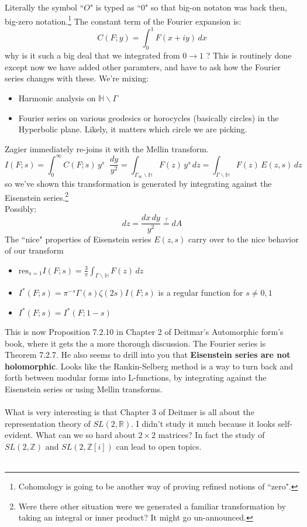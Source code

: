 \documentclass[12pt]{article}
\begin{document}
Literally the symbol ``$O$" is typed as ``$0$" so that big-on notaton was back then, big-zero notation.\footnote{Cohomology is going to be another way of proving refined notions of ``zero".}  The constant term of the Fourier expansion is:
$$ C(F;y) = \int_0^1 F(x + iy) \, dx $$
why is it such a big deal that we integrated from $0 \to 1$ ? This is routinely done except now we have added other paramters, and have to ask how the Fourier series changes with these.    We're mixing:
\begin{itemize}
\item Harmonic analysis on $\mathbb{H}\backslash \Gamma$
\item Fourier series on various geodesics or horocycles (basically circles) in the Hyperbolic plane.  Likely, it matters which circle we are picking.
\end{itemize}
Zagier immediately re-joins it with the Mellin transform. 
$$ I(F;s) = \int_0^\infty C(F;s) \, y^s \;\; \frac{dy}{y^2} 
= \int_{\Gamma_\infty \backslash \mathbb{H}} F(z) \, y^s \, dz = \int_{\Gamma \backslash \mathbb{H}} F(z) \, E(z,s) \, dz $$
so we've shown this transformation is {\color{red!50!black}generated} by integrating against the Eisenstein series.\footnote{Were there other situation were we generated a familiar transformation by taking an integral or inner product?  It might go un-announced.} \\ 
Possibly:
$$ dz = \frac{dx \, dy}{y^2} \stackrel{?}{=} dA $$
The ``nice" properties of Eisenstein series $E(z,s)$ carry over to the nice behavior of our transform
\begin{itemize}
\item $ \mathrm{res}_{s=1}I(F;s) = \frac{3}{\pi} \int_{\Gamma \backslash \mathbb{H}} F(z) \, dz $ 
\item $\displaystyle I^*(F;s) = \pi^{-s} \Gamma(s) \zeta(2s) I(F;s)$ is a regular function for $s \neq 0,1 $
\item $I^*(F;s) = I^*(F; 1-s)$
\end{itemize}
This is now Proposition 7.2.10 in Chapter 2 of Deitmar's Automorphic form's book, where it gets the a more thorough discussion.  The Fourier series is Theorem 7.2.7.  He also seems to drill into you that \textbf{Eisenstein series are not holomorphic}.  Looks like the Rankin-Selberg method is a way to turn back and forth between modular forms into L-functions, by integrating against the Eisenstein series or using Mellin transforms. \\ \\
What is very interesting is that Chapter 3 of Deitmer is all about the representation theory of $SL(2, \mathbb{R})$.  I didn't study it much because it looks self-evident.  What can we so hard about $2 \times 2$ matrices?  In fact the study of $SL(2, \mathbb{Z})$ and $SL(2, \mathbb{Z}[i])$ can lead to open topics. \\ \\
\end{document}
